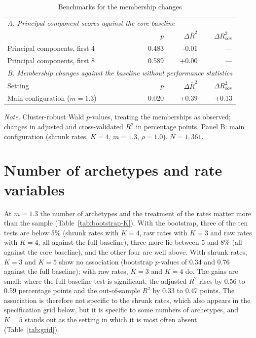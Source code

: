 \begin{table}[ht]
	\centering
	\small
	\caption{Benchmarks for the membership changes}
	\label{tab:minimal}
	\begin{tabular}{lrrr}
		\toprule
		\multicolumn{4}{l}{\emph{A. Principal component scores against the core baseline}} \\
		 & $p$ & $\Delta\bar R^2$ & $\Delta R^2_{oos}$ \\
		\midrule
Principal components, first 4 & 0.483 & -0.01 & --- \\
Principal components, first 8 & 0.589 & +0.00 & --- \\
		\midrule
		\multicolumn{4}{l}{\emph{B. Membership changes against the baseline without performance statistics}} \\
		Setting & $p$ & $\Delta\bar R^2$ & $\Delta R^2_{oos}$ \\
		\midrule
Main configuration ($m=1.3$) & 0.020 & +0.39 & +0.13 \\
		\bottomrule
	\end{tabular}
	\par\smallskip
	\parbox{0.95\textwidth}{\footnotesize\emph{Note.} Cluster-robust Wald $p$-values, treating the memberships as observed; changes in adjusted and cross-validated $R^2$ in percentage points. Panel B: main configuration (shrunk rates, $K=4$, $m=1.3$, $\rho=1.0$). $N=1{,}361$.}
\end{table}

\section{Number of archetypes and rate variables}
\label{sec:rob-K}

At $m=1.3$ the number of archetypes and the treatment of the rates matter more than the sample (Table~\ref{tab:bootstrap-K}). With the bootstrap, three of the ten tests are below 5\% (shrunk rates with $K=4$, raw rates with $K=3$ and raw rates with $K=4$, all against the full baseline), three more lie between 5 and 8\% (all against the core baseline), and the other four are well above. With shrunk rates, $K=3$ and $K=5$ show no association (bootstrap $p$-values of 0.34 and 0.76 against the full baseline); with raw rates, $K=3$ and $K=4$ do. The gains are small: where the full-baseline test is significant, the adjusted $R^2$ rises by 0.56 to 0.59 percentage points and the out-of-sample $R^2$ by 0.33 to 0.47 points. The association is therefore not specific to the shrunk rates, which also appears in the specification grid below, but it is specific to some numbers of archetypes, and $K=5$ stands out as the setting in which it is most often absent (Table~\ref{tab:grid}).


